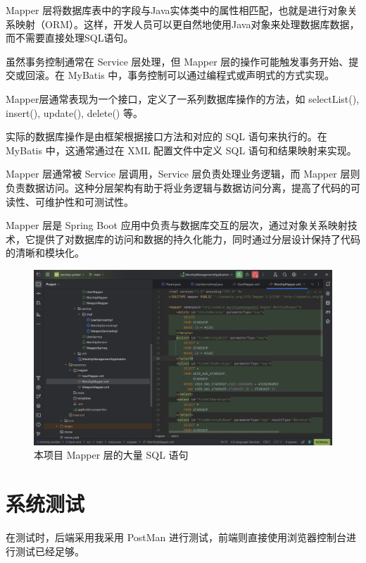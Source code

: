 \documentclass{base}
\begin{document}
Mapper 层将数据库表中的字段与Java实体类中的属性相匹配，也就是进行对象关系映射（ORM）。这样，开发人员可以更自然地使用Java对象来处理数据库数据，而不需要直接处理SQL语句。

虽然事务控制通常在 Service 层处理，但 Mapper 层的操作可能触发事务开始、提交或回滚。在 MyBatis 中，事务控制可以通过编程式或声明式的方式实现。

Mapper层通常表现为一个接口，定义了一系列数据库操作的方法，如 selectList(), insert(), update(), delete() 等。

实际的数据库操作是由框架根据接口方法和对应的 SQL 语句来执行的。在 MyBatis 中，这通常通过在 XML 配置文件中定义 SQL 语句和结果映射来实现。

Mapper 层通常被 Service 层调用，Service 层负责处理业务逻辑，而 Mapper 层则负责数据访问。这种分层架构有助于将业务逻辑与数据访问分离，提高了代码的可读性、可维护性和可测试性。

Mapper 层是 Spring Boot 应用中负责与数据库交互的层次，通过对象关系映射技术，它提供了对数据库的访问和数据的持久化能力，同时通过分层设计保持了代码的清晰和模块化。

\begin{figure}[H]
	\centering
	\includegraphics[width=\linewidth]{images/MapperLayer}
	\caption{本项目 Mapper 层的大量 SQL 语句}
	\label{fig:mapperlayer}
\end{figure}

\section{系统测试}
在测试时，后端采用我采用 PostMan 进行测试，前端则直接使用浏览器控制台进行测试已经足够。
\end{document}
